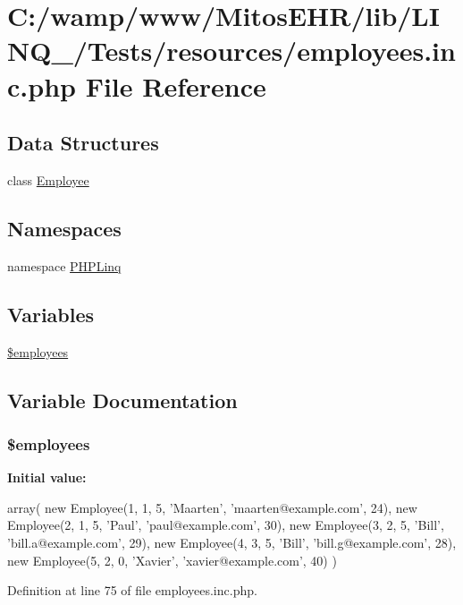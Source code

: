 \hypertarget{employees_8inc_8php}{\section{\-C\-:/wamp/www/\-Mitos\-E\-H\-R/lib/\-L\-I\-N\-Q\-\_/\-Tests/resources/employees.inc.\-php \-File \-Reference}
\label{employees_8inc_8php}
}
\subsection*{\-Data \-Structures}
\begin{DoxyCompactItemize}
\item 
class \hyperlink{class_employee}{\-Employee}
\end{DoxyCompactItemize}
\subsection*{\-Namespaces}
\begin{DoxyCompactItemize}
\item 
namespace \hyperlink{namespace_p_h_p_linq}{\-P\-H\-P\-Linq}
\end{DoxyCompactItemize}
\subsection*{\-Variables}
\begin{DoxyCompactItemize}
\item 
\hyperlink{employees_8inc_8php_a598c06abe9d65a9d2990e39693ce2c27}{\$employees}
\end{DoxyCompactItemize}


\subsection{\-Variable \-Documentation}
\hypertarget{employees_8inc_8php_a598c06abe9d65a9d2990e39693ce2c27}{
\subsubsection[{\$employees}]{\setlength{\rightskip}{0pt plus 5cm}\$employees}}\label{employees_8inc_8php_a598c06abe9d65a9d2990e39693ce2c27}
{\bfseries \-Initial value\-:}
\begin{DoxyCode}
 array(
        new Employee(1, 1, 5, 'Maarten', 'maarten@example.com', 24),
        new Employee(2, 1, 5, 'Paul', 'paul@example.com', 30),
        new Employee(3, 2, 5, 'Bill', 'bill.a@example.com', 29),
        new Employee(4, 3, 5, 'Bill', 'bill.g@example.com', 28),
        new Employee(5, 2, 0, 'Xavier', 'xavier@example.com', 40)
)
\end{DoxyCode}


\-Definition at line 75 of file employees.\-inc.\-php.

